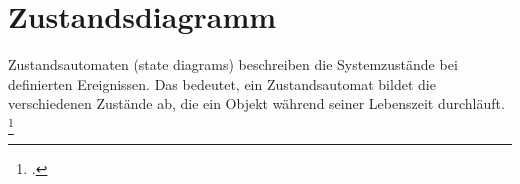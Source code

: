 \documentclass{lehramt-informatik-haupt}
\begin{document}

\chapter{Zustandsdiagramm}

\begin{quellen}
\item \cite[Seite 329-400]{rupp}
\item \cite{net:pdf:zustandsdiagramm}
\end{quellen}

\noindent
Zustandsautomaten (state diagrams) beschreiben die Systemzustände bei
definierten Ereignissen. Das bedeutet, ein Zustandsautomat bildet die
verschiedenen Zustände ab, die ein Objekt während seiner Lebenszeit
durchläuft.
\footcite[Seite 166]{schatten}
\end{document}
